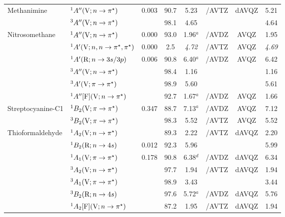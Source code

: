 \begin{tabular}{llcccccc}
      Methanimine	&$^1A^{\prime\prime}(\mathrm{V}; n \rightarrow \pi^\star)$ 					&0.003	&90.7 &5.23		&{\exCI}/AVTZ & dAVQZ		&5.21	\\
                        &$^3A^{\prime\prime} (\mathrm{V}; n \rightarrow \pi^\star)$					&		&98.1 &4.65		&			&			&4.64	\\	
      Nitrosomethane&$^1A^{\prime\prime} (\mathrm{V};n \rightarrow \pi^\star)$					& 0.000	&93.0 &1.96$^a$	& {\exCI}/AVDZ & AVQZ		&1.95	 \\
                        &$^1A^\prime (\mathrm{V};n,n \rightarrow \pi^\star,\pi^\star)$				&0.000	&2.5	  &\emph{4.72}		& {\exCI}/AVTZ & AVQZ		& \emph{4.69}	\\
                        &$^1A^\prime (\mathrm{R};n \rightarrow 3s/3p)$ 						&0.006	&90.8 &6.40$^a$	&{\exCI}/AVDZ	& AVQZ		&6.42 	\\
                        &$^3A^{\prime\prime} (\mathrm{V};n \rightarrow \pi^\star)$					&		&98.4 &1.16		&			&			&1.16 	\\
                        &$^3A^\prime (\mathrm{V};\pi \rightarrow \pi^\star)$					&		&98.9 &5.60		&			&			&5.61	\\
                        &$^1A^{\prime\prime} [\mathrm{F}]	(\mathrm{V};n \rightarrow \pi^\star)$			&		&92.7&1.67$^a$	&{\exCI}/AVDZ	& AVQZ		&1.66	\\
      Streptocyanine-C1&$^1B_2 (\mathrm{V};\pi \rightarrow \pi^\star)$ 				& 0.347	&88.7&7.13$^a$	& {\exCI}/AVDZ & AVQZ		&7.12	\\
                        &	$^3B_2 (\mathrm{V};\pi \rightarrow \pi^\star)$ 				& 		&98.3 &5.52		& {\exCI}/AVTZ & AVQZ		&5.52	 \\
      Thioformaldehyde&$^1A_2 (\mathrm{V};n \rightarrow \pi^\star)$ 				&		&89.3 &2.22		&  {\exCI}/AVTZ & dAVQZ		&2.20	\\
                        &$^1B_2 (\mathrm{R};n \rightarrow 4s)$ 						& 0.012	&92.3 &5.96		&			&			&5.99	\\
                        &$^1A_1 (\mathrm{V};\pi \rightarrow \pi^\star)$				& 0.178	&90.8 &6.38$^d$	&{\CCSDTQ}/AVDZ& dAVQZ	&6.34	\\
                        &$^3A_2 (\mathrm{V};n \rightarrow \pi^\star)$ 					&		&97.7 &1.94		&{\exCI}/AVTZ & dAVQZ		&1.94	\\
                        &$^3A_1 (\mathrm{V};\pi \rightarrow \pi^\star)$				&		&98.9 & 3.43		&			&			&3.44	\\
                        &$^3B_2 (\mathrm{R};n \rightarrow 4s)$ 						&		&97.6 &5.72$^a$	&{\exCI}/AVDZ& dAVQZ		&5.76	\\
                        &$^1A_2 [\mathrm{F}] (\mathrm{V};n \rightarrow \pi^\star)$		&		&87.2 &1.95		&{\exCI}/AVTZ & dAVQZ		&1.94	\\

\end{tabular}
